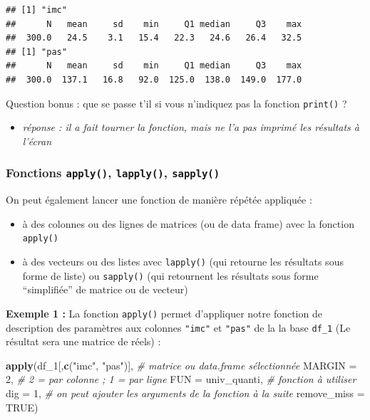 \documentclass[
]{book}
\newenvironment{Shaded}{\begin{snugshade}}{\end{snugshade}}
\newcommand{\AttributeTok}[1]{\textcolor[rgb]{0.13,0.29,0.53}{#1}}
\newcommand{\CommentTok}[1]{\textcolor[rgb]{0.56,0.35,0.01}{\textit{#1}}}
\newcommand{\ConstantTok}[1]{\textcolor[rgb]{0.56,0.35,0.01}{#1}}
\newcommand{\DecValTok}[1]{\textcolor[rgb]{0.00,0.00,0.81}{#1}}
\newcommand{\FunctionTok}[1]{\textcolor[rgb]{0.13,0.29,0.53}{\textbf{#1}}}
\newcommand{\NormalTok}[1]{#1}
\newcommand{\StringTok}[1]{\textcolor[rgb]{0.31,0.60,0.02}{#1}}
\providecommand{\tightlist}{%
  \setlength{\itemsep}{0pt}\setlength{\parskip}{0pt}}
\begin{document}
\begin{verbatim}
## [1] "imc"
##      N   mean     sd    min     Q1 median     Q3    max 
##  300.0   24.5    3.1   15.4   22.3   24.6   26.4   32.5 
## [1] "pas"
##      N   mean     sd    min     Q1 median     Q3    max 
##  300.0  137.1   16.8   92.0  125.0  138.0  149.0  177.0
\end{verbatim}

Question bonus : que se passe t'il si vous n'indiquez pas la fonction \texttt{print()} ?

\begin{itemize}
\tightlist
\item
  \emph{réponse : il a fait tourner la fonction, mais ne l'a pas imprimé les résultats à l'écran}
\end{itemize}

\subsubsection{\texorpdfstring{Fonctions \texttt{apply()}, \texttt{lapply()}, \texttt{sapply()}}{Fonctions apply(), lapply(), sapply()}}\label{fonctions-apply-lapply-sapply}

On peut également lancer une fonction de manière répétée appliquée :

\begin{itemize}
\tightlist
\item
  à des colonnes ou des lignes de matrices (ou de data frame) avec la fonction \texttt{apply()}
\item
  à des vecteurs ou des listes avec \texttt{lapply()} (qui retourne les résultats sous forme de liste) ou \texttt{sapply()} (qui retournent les résultats sous forme ``simplifiée'' de matrice ou de vecteur)
\end{itemize}

\textbf{Exemple 1 :} La fonction \texttt{apply()} permet d'appliquer notre fonction de description des paramètres aux colonnes \texttt{"imc"} et \texttt{"pas"} de la la base \texttt{df\_1} (Le résultat sera une matrice de réels) :

\begin{Shaded}
\begin{Highlighting}[]
\FunctionTok{apply}\NormalTok{(df\_1[,}\FunctionTok{c}\NormalTok{(}\StringTok{"imc"}\NormalTok{, }\StringTok{"pas"}\NormalTok{)], }\CommentTok{\# matrice ou data.frame sélectionnée}
      \AttributeTok{MARGIN =} \DecValTok{2}\NormalTok{, }\CommentTok{\# 2 = par colonne ;  1 = par ligne}
      \AttributeTok{FUN =}\NormalTok{ univ\_quanti, }\CommentTok{\# fonction à utiliser}
      \AttributeTok{dig =} \DecValTok{1}\NormalTok{, }\CommentTok{\# on peut ajouter les arguments de la fonction à la suite}
      \AttributeTok{remove\_miss =} \ConstantTok{TRUE}\NormalTok{) }
\end{Highlighting}
\end{Shaded}
\end{document}
